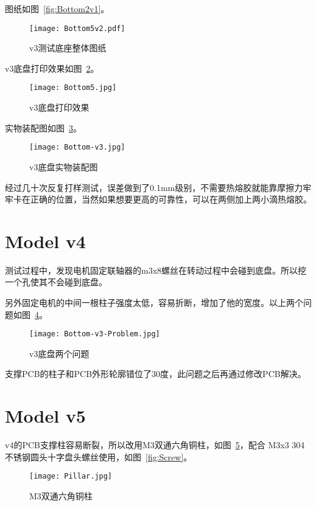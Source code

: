 图纸如图~\ref{fig:Bottom2v1}。

\begin{figure}[htbp]
    \centering
    \texttt{[image: Bottom5v2.pdf]}
    \caption{v3测试底座整体图纸}
    \label{fig:Bottom5v2}
\end{figure}

v3底盘打印效果如图~\ref{fig:Bottom5}。

\begin{figure}[htbp]
    \centering
    \texttt{[image: Bottom5.jpg]}
    \caption{v3底盘打印效果}
    \label{fig:Bottom5}
\end{figure}

实物装配图如图~\ref{fig:Bottom-v3}。

\begin{figure}[htbp]
    \centering
    \texttt{[image: Bottom-v3.jpg]}
    \caption{v3底盘实物装配图}
    \label{fig:Bottom-v3}
\end{figure}

经过几十次反复打样测试，误差做到了0.1mm级别，不需要热熔胶就能靠摩擦力牢牢卡在正确的位置，当然如果想要更高的可靠性，可以在两侧加上两小滴热熔胶。

\section{Model v4}

测试过程中，发现电机固定联轴器的m3x8螺丝在转动过程中会碰到底盘。所以挖一个孔使其不会碰到底盘。

另外固定电机的中间一根柱子强度太低，容易折断，增加了他的宽度。以上两个问题如图~\ref{fig:Bottom-v3-Problem}。

\begin{figure}[htbp]
    \centering
    \texttt{[image: Bottom-v3-Problem.jpg]}
    \caption{v3底盘两个问题}
    \label{fig:Bottom-v3-Problem}
\end{figure}

支撑PCB的柱子和PCB外形轮廓错位了30度，此问题之后再通过修改PCB解决。

\section{Model v5}

v4的PCB支撑柱容易断裂，所以改用M3双通六角铜柱，如图~\ref{fig:Pillar}，配合 M3x3 304不锈钢圆头十字盘头螺丝使用，如图~\ref{fig:Screw}。

\begin{figure}[htbp]
    \centering
    \texttt{[image: Pillar.jpg]}
    \caption{M3双通六角铜柱}
    \label{fig:Pillar}
\end{figure}


